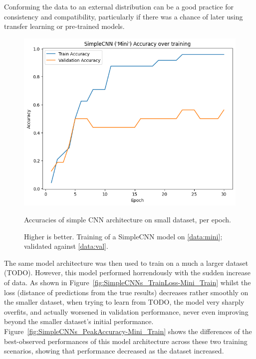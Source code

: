                Conforming the data to an external distribution can be a good practice for consistency and compatibility, particularly if there was a chance of later using transfer learning or pre-trained models.
    
                \begin{figure}[h]
                    \centering
                    \includegraphics[width=\textwidth]{images/SimpleCNN-Mini_Train.png}
                    \caption{Accuracies of simple CNN architecture on small dataset, per epoch.}
                    \label{fig:SimpleCNN-Mini_Train}
                    \caption*{Higher is better. Training of a SimpleCNN model on \ref{data:mini}; validated against \ref{data:val}.}
                \end{figure}
    
                The same model architecture was then used to train on a much a larger dataset (TODO). However, this model performed horrendously with the sudden increase of data. As shown in Figure~\ref{fig:SimpleCNNs_TrainLoss-Mini_Train} whilst the loss (distance of predictions from the true results) decreases rather smoothly on the smaller dataset, when trying to learn from TODO, the model very sharply overfits, and actually worsened in validation performance, never even improving beyond the smaller dataset's initial performance. Figure~\ref{fig:SimpleCNNs_PeakAccuracy-Mini_Train} shows the differences of the best-observed performances of this model architecture across these two training scenarios, showing that performance decreased as the dataset increased.
        
